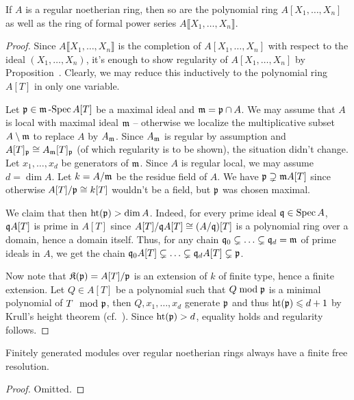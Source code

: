 \documentclass[a4paper,parskip=half,numbers=enddot, DIV=12]{scrreprt}
\renewcommand{\geq}{\geqslant}
\renewcommand{\leq}{\leqslant}
\begin{document}
\begin{prop}
	If $A$ is a regular noetherian ring, then so are the polynomial ring $A[X_1,\ldots,X_n]$ as well as the ring of formal power series $A\llbracket X_1,\ldots,X_n\rrbracket$.
\end{prop}
\begin{proof}
	Since $A\llbracket X_1,\ldots,X_n\rrbracket$ is the completion of $A[X_1,\ldots,X_n]$ with respect to the ideal $(X_1,\ldots,X_n)$, it's enough to show regularity of $A[X_1,\ldots,X_n]$ by Proposition~. Clearly, we may reduce this inductively to the polynomial ring $A[T]$ in only one variable. 
	
	Let $\mathfrak{p}\in\mathfrak{m}\operatorname{-Spec} A[T]$ be a maximal ideal and $\mathfrak{m}=\mathfrak{p}\cap A$. We may assume that $A$ is local with maximal ideal $\mathfrak{m}$ -- otherwise we localize the multiplicative subset $A\setminus \mathfrak{m}$ to replace $A$ by $A_{\mathfrak{m}}$. Since $A_{\mathfrak{m}}$ is regular by assumption and $A[T]_{\mathfrak{p}}\cong A_{\mathfrak{m}}[T]_{\mathfrak{p}}$ (of which regularity is to be shown), the situation didn't change. Let $x_1,\ldots,x_d$ be generators of $\mathfrak{m}$. Since $A$ is regular local, we may assume $d=\dim A$. Let $k=A/\mathfrak{m}$ be the residue field of $A$. We have $\mathfrak{p}\supsetneq \mathfrak{m} A[T]$ since otherwise $A[T]/\mathfrak{p}\cong k[T]$ wouldn't be a field, but $\mathfrak{p}$ was chosen maximal. %
	
	We claim that then $\operatorname{ht}(\mathfrak{p})>\dim A$. Indeed, for every prime ideal $\mathfrak{q}\in\operatorname{Spec} A$, $\mathfrak{q} A[T]$ is prime in $A[T]$ since $A[T]/\mathfrak{q} A[T]\cong (A/\mathfrak{q})[T]$ is a polynomial ring over a domain, hence a domain itself. Thus, for any chain $\mathfrak{q}_0\subsetneq \ldots\subsetneq \mathfrak{q}_d=\mathfrak{m}$ of prime ideals in $A$, we get the chain $\mathfrak{q}_0 A[T]\subsetneq \ldots\subsetneq \mathfrak{q}_d A[T]\subsetneq \mathfrak{p}$.
	
	Now note that $\mathfrak{K}(\mathfrak{p})=A[T]/\mathfrak{p}$ is an extension of $k$ of finite type, hence a finite extension. Let $Q\in A[T]$ be a polynomial such that $Q\bmod \mathfrak{p}$ is a minimal polynomial of $T\mod{\mathfrak{p}}$, then $Q,x_1,\ldots,x_d$ generate $\mathfrak{p}$ and thus $\hoehe(\pp)\leq d+1$ by Krull's height theorem (cf.\ \cite[Theorem~12]{alg2}). Since $\operatorname{ht}(\mathfrak{p})>d$, equality holds and regularity follows.
\end{proof}
\begin{prop}
	Finitely generated modules over regular noetherian rings always have a finite free resolution.
\end{prop}
\begin{proof}
	Omitted.
\end{proof}
\end{document}
